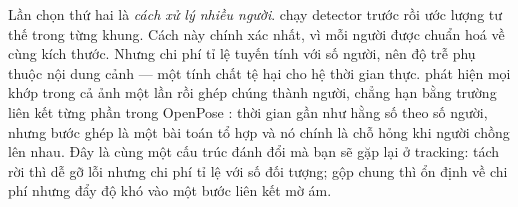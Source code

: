 \documentclass[../../../deep_learning.tex]{subfiles}
\begin{document}
Lần chọn thứ hai là \emph{cách xử lý nhiều người}.  chạy detector trước rồi ước lượng tư thế trong từng khung. Cách này chính xác nhất, vì mỗi người được chuẩn hoá về cùng kích thước. Nhưng chi phí tỉ lệ tuyến tính với số người, nên độ trễ phụ thuộc nội dung cảnh --- một tính chất tệ hại cho hệ thời gian thực.  phát hiện mọi khớp trong cả ảnh một lần rồi ghép chúng thành người, chẳng hạn bằng trường liên kết từng phần trong OpenPose \cite{cao2017openpose}: thời gian gần như hằng số theo số người, nhưng bước ghép là một bài toán tổ hợp và nó chính là chỗ hỏng khi người chồng lên nhau. 
Đây là cùng một cấu trúc đánh đổi mà bạn sẽ gặp lại ở tracking: tách rời thì dễ gỡ lỗi nhưng chi phí tỉ lệ với số đối tượng; gộp chung thì ổn định về chi phí nhưng đẩy độ khó vào một bước liên kết mờ ám.
\end{document}
